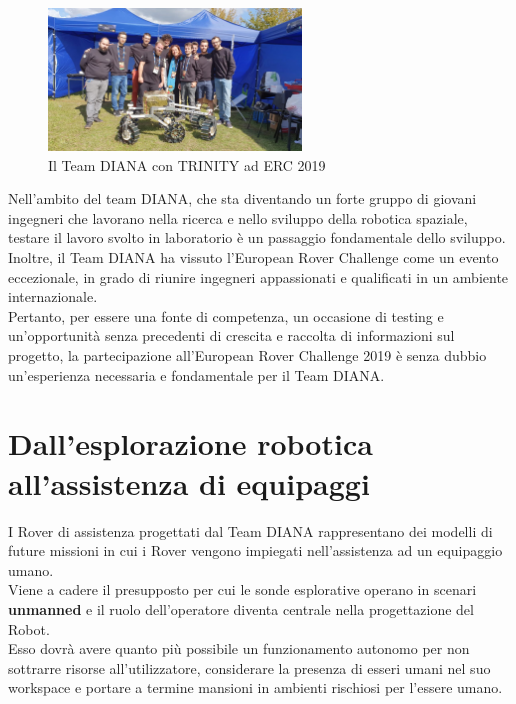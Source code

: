 \documentclass[%
corpo=11pt,
twoside,
 stile=classica,
oldstyle,
greek,%
]{toptesi}
\begin{document}
\begin{figure}
	\centering
	\includegraphics[width=0.6\textwidth]{image/trinityerc.jpeg}
	\caption{Il Team DIANA con TRINITY ad ERC 2019}
	\label{fig:trinityerc}
\end{figure}


Nell'ambito del team DIANA, che sta diventando un forte gruppo di giovani ingegneri che lavorano nella ricerca e nello sviluppo della robotica spaziale, testare il lavoro svolto in laboratorio è un passaggio fondamentale dello sviluppo.\\
Inoltre, il Team DIANA ha vissuto l'European Rover Challenge come un evento eccezionale, in grado di riunire ingegneri appassionati e qualificati in un ambiente internazionale.\\

Pertanto, per essere una fonte di competenza, un occasione di testing e un'opportunità senza precedenti di crescita e raccolta di informazioni sul progetto, la partecipazione all'European Rover Challenge 2019 è senza dubbio un'esperienza necessaria e fondamentale per il Team DIANA.\\

	\section{Dall'esplorazione robotica all'assistenza di equipaggi}
	I Rover di assistenza progettati dal Team DIANA rappresentano dei modelli di future missioni in cui i Rover vengono impiegati nell'assistenza ad un equipaggio umano. \\
	Viene a cadere il presupposto per cui le sonde esplorative operano in scenari \textbf{unmanned} e il ruolo dell'operatore diventa centrale nella progettazione del Robot.\\
	 Esso dovrà avere quanto più possibile un funzionamento autonomo per non sottrarre risorse all'utilizzatore, considerare la presenza di esseri umani nel suo workspace e portare a termine mansioni in ambienti rischiosi per l'essere umano. 
	 
		
\end{document}
